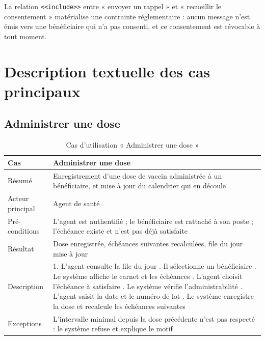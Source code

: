 \documentclass[11pt,a4paper]{report}
\begin{document}
La relation \texttt{<<include>>} entre « envoyer un rappel » et « recueillir
le consentement » matérialise une contrainte réglementaire : aucun message
n'est émis vers une bénéficiaire qui n'a pas consenti, et ce consentement
est révocable à tout moment.

\section{Description textuelle des cas principaux}

\subsection{Administrer une dose}

\begin{table}[H]
\centering
\begin{tabularx}{\textwidth}{@{}lX@{}}
\toprule
\textbf{Cas} & Administrer une dose \\
\midrule
Résumé & Enregistrement d'une dose de vaccin administrée à un bénéficiaire,
et mise à jour du calendrier qui en découle \\
Acteur principal & Agent de santé \\
Pré-conditions & L'agent est authentifié ; le bénéficiaire est rattaché à
son poste ; l'échéance existe et n'est pas déjà satisfaite \\
Résultat & Dose enregistrée, échéances suivantes recalculées, file du jour
mise à jour \\
\addlinespace
Description &
1. L'agent consulte la file du jour \newline
2. Il sélectionne un bénéficiaire \newline
3. Le système affiche le carnet et les échéances \newline
4. L'agent choisit l'échéance à satisfaire \newline
5. Le système vérifie l'administrabilité \newline
6. L'agent saisit la date et le numéro de lot \newline
7. Le système enregistre la dose et recalcule les échéances suivantes \\
\addlinespace
Exceptions & L'intervalle minimal depuis la dose précédente n'est pas
respecté : le système refuse et explique le motif \\
\bottomrule
\end{tabularx}
\caption{Cas d'utilisation « Administrer une dose »}
\end{table}
\end{document}
